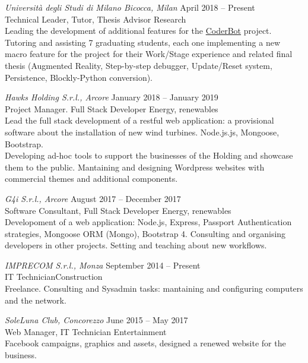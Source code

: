 \documentclass[11pt]{res} %
\begin{document}
\begin{resume}
\pagebreak
{\sl Università degli Studi di Milano Bicocca, Milan} \hfill April 2018 -- Present \\
{\sbb Technical Leader, Tutor, Thesis Advisor}  \hfill Research \\
Leading the development of additional features for the \href{ttp://www.coderbot.org/}{CoderBot} project. Tutoring and assisting 7 graduating students, each one implementing a new macro feature for the project for their Work/Stage experience and related final thesis (Augmented Reality, Step-by-step debugger, Update/Reset system, Persistence, Blockly-Python conversion).

{\sl Hawks Holding S.r.l., Arcore} \hfill 
January 2018 -- January 2019 \\
{\sbb Project Manager. Full Stack Developer} \hfill Energy, renewables \\
Lead the full stack development of a restful web application: a provisional software about the installation of new wind turbines. Node.js.js, Mongoose, Bootstrap.\\
Developing ad-hoc tools to support the businesses of the Holding and showcase them to the public. Mantaining and designing Wordpress websites with commercial themes and additional components.

{\sl G4i S.r.l., Arcore} \hfill 
August 2017 -- December 2017\\
{\sbb Software Consultant, Full Stack Developer}   \hfill Energy, renewables  \\
Developoment of a web application: Node.js, Express, Passport Authentication strategies, Mongoose ORM (Mongo), Bootstrap 4. Consulting and organising developers in other projects. Setting and teaching about new workflows.

{\sl IMPRECOM S.r.l., Monza} \hfill 
September 2014 -- Present \\
{\sbb IT Technician}\hfill Construction \\
Freelance. Consulting and Sysadmin tasks: mantaining and configuring computers and the network.

{\sl SoleLuna Club, Concorezzo} \hfill 
June 2015 -- May 2017 \\
{\sbb Web Manager, IT Technician }\hfill Entertainment\\
Facebook campaigns, graphics and assets, designed a renewed website for the business.


\vspace{0.2in} %


\end{resume}
\end{document}
